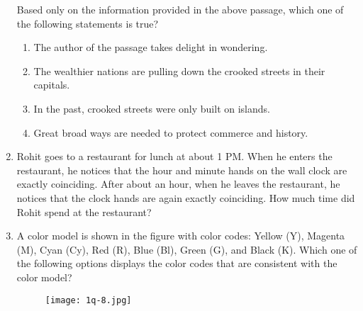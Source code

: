 \documentclass[journal,12pt,onecolumn]{article}
\theoremstyle{remark}
\begin{document}
\begin{enumerate}
Based only on the information provided in the above passage, which one of the following statements is true?

\hfill{}
\begin{enumerate}
    \item The author of the passage takes delight in wondering.
    \item The wealthier nations are pulling down the crooked streets in their capitals.
    \item In the past, crooked streets were only built on islands.
    \item Great broad ways are needed to protect commerce and history.
\end{enumerate}

\item Rohit goes to a restaurant for lunch at about 1 PM. When he enters the restaurant, he notices that the hour and minute hands on the wall clock are exactly coinciding. After about an hour, when he leaves the restaurant, he notices that the clock hands are again exactly coinciding. How much time  did Rohit spend at the restaurant?

\hfill{}
\begin{enumerate}
\end{enumerate}

\item A color model is shown in the figure  with color codes: Yellow (Y), Magenta (M), Cyan (Cy), Red (R), Blue (Bl), Green (G), and Black (K). Which one of the following options displays the color codes that are consistent with the color model?
\begin{figure}[H]
    \centering
    \texttt{[image: 1q-8.jpg]}
    \caption{}
    \label{fig:q8}
\end{figure}


\end{enumerate}
\end{document}
